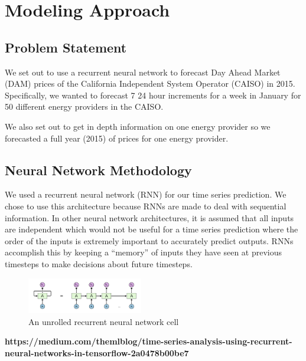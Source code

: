 \documentclass[sigconf]{acmart}
\begin{document}

\section{Modeling Approach}
\label{sec:approach}

\subsection{Problem Statement}
We set out to use a recurrent neural network to forecast Day Ahead Market (DAM) prices of the California Independent System Operator (CAISO)  in 2015. Specifically, we wanted to forecast 7 24 hour increments for a week in January for 50 different energy providers in the CAISO. 

We also set out to get in depth information on one energy provider so we forecasted a full year (2015) of prices for one energy provider.

\subsection{Neural Network Methodology}
We used a recurrent neural network (RNN) for our time series prediction. We chose to use this architecture because RNNs are made to deal with sequential information. In other neural network architectures, it is assumed that all inputs are independent which would not be useful for a time series prediction where the order of the inputs is extremely important to accurately predict outputs. RNNs accomplish this by keeping a “memory” of inputs they have seen at previous timesteps to make decisions about future timesteps. 

\begin{figure}[h]
\includegraphics[width=0.45\textwidth]{tex_writing/rnn.png}
\caption{An unrolled recurrent neural network cell}
\label{fig:rnn}
\end{figure}
\textbf{https://medium.com/themlblog/time-series-analysis-using-recurrent-neural-networks-in-tensorflow-2a0478b00be7}
\end{document}

